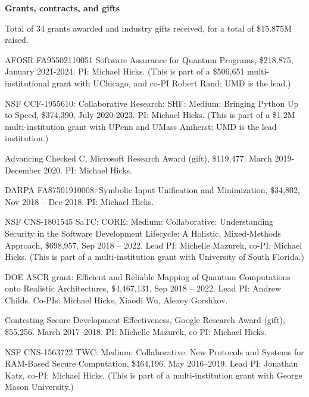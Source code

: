 \documentclass[11pt]{article}
\begin{document}
\begin{description}
\setlength{\labelsep}{0ex}
\setlength{\itemsep}{-0.5ex}

\item {\bf\textsf Grants, contracts, and gifts}

\item Total of 34 grants awarded and industry gifts received, for a
  total of \$15.875M raised. 

\item

\item AFOSR FA95502110051 Software Assurance for Quantum Programs, \$218,875, January 2021-2024. PI: Michael Hicks. (This is part of a \$506,651 multi-institutional grant with UChicago, and co-PI Robert Rand; UMD is the lead.)

\item NSF CCF-1955610: Collaborative Research: SHF: Medium: Bringing Python Up to Speed, \$374,390, July 2020-2023. PI: Michael Hicks. (This is part of a \$1.2M multi-institution grant with UPenn and UMass Amherst; UMD is the lead institution.)

\item Advancing Checked C, Microsoft Research Award (gift), \$119,477. March 2019-December 2020. PI: Michael Hicks.

\item DARPA FA87501910008: Symbolic Input Unification and Minimization, \$34,802, Nov 2018 -- Dec 2018. PI: Michael Hicks.

\item NSF CNS-1801545 SaTC: CORE: Medium: Collaborative: Understanding Security in the Software Development Lifecycle: A Holistic, Mixed-Methods Approach, \$698,957, Sep 2018 -- 2022. Lead PI: Michelle Mazurek, co-PI: Michael Hicks. (This is part of a multi-institution grant with University of South Florida.)

\item DOE ASCR grant: Efficient and Reliable Mapping of Quantum Computations onto Realistic Architectures, \$4,467,131, Sep 2018 -- 2022. Lead PI: Andrew Childs. Co-PIs: Michael Hicks, Xiaodi Wu, Alexey Gorshkov.

\item Contesting Secure Development Effectiveness, Google Research Award (gift), \$55,256. March 2017--2018. PI: Michelle Mazurek, co-PI: Michael Hicks.

\item NSF CNS-1563722 TWC: Medium: Collaborative: New Protocols and Systems for RAM-Based Secure Computation,  \$464,196. May 2016--2019. Lead PI: Jonathan Katz, co-PI: Michael Hicks. (This is part of a multi-institution grant with George Mason University.)


\end{description}
\end{document}
